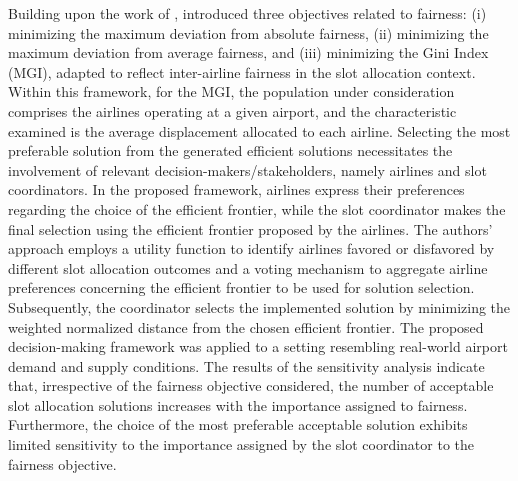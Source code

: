 Building upon the work of ,  introduced three objectives related to fairness: (i) minimizing the maximum deviation from absolute fairness, (ii) minimizing the maximum deviation from average fairness, and (iii) minimizing the Gini Index (MGI), adapted to reflect inter-airline fairness in the slot allocation context. Within this framework, for the MGI, the population under consideration comprises the airlines operating at a given airport, and the characteristic examined is the average displacement allocated to each airline. Selecting the most preferable solution from the generated efficient solutions necessitates the involvement of relevant decision-makers/stakeholders, namely airlines and slot coordinators. In the proposed framework, airlines express their preferences regarding the choice of the efficient frontier, while the slot coordinator makes the final selection using the efficient frontier proposed by the airlines. The authors' approach employs a utility function to identify airlines favored or disfavored by different slot allocation outcomes and a voting mechanism to aggregate airline preferences concerning the efficient frontier to be used for solution selection. Subsequently, the coordinator selects the implemented solution by minimizing the weighted normalized distance from the chosen efficient frontier. The proposed decision-making framework was applied to a setting resembling real-world airport demand and supply conditions. The results of the sensitivity analysis indicate that, irrespective of the fairness objective considered, the number of acceptable slot allocation solutions increases with the importance assigned to fairness. Furthermore, the choice of the most preferable acceptable solution exhibits limited sensitivity to the importance assigned by the slot coordinator to the fairness objective.

